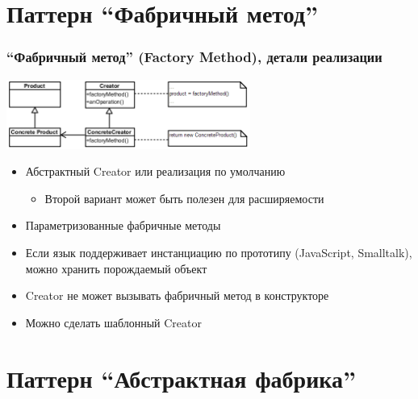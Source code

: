 \documentclass[xetex,mathserif,serif]{beamer}
\begin{document}
	\section{Паттерн ``Фабричный метод''}

	\begin{frame}
		\frametitle{``Фабричный метод'' (Factory Method), детали реализации}
		\begin{center}
			\includegraphics[width=0.6\textwidth]{factoryMethod.png}
		\end{center}
		\begin{itemize}
			\item Абстрактный Creator или реализация по умолчанию
			\begin{itemize}
				\item Второй вариант может быть полезен для расширяемости
			\end{itemize}
			\item Параметризованные фабричные методы
			\item Если язык поддерживает инстанциацию по прототипу (JavaScript, Smalltalk), можно хранить порождаемый объект
			\item Creator не может вызывать фабричный метод в конструкторе
			\item Можно сделать шаблонный Creator
		\end{itemize}
	\end{frame}

	\section{Паттерн ``Абстрактная фабрика''}
\end{document}
